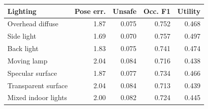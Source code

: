 \begin{tabular}{lrrrr}
\toprule
Lighting & Pose err. & Unsafe & Occ. F1 & Utility \\
\midrule
Overhead diffuse & 1.87 & 0.075 & 0.752 & 0.468 \\
Side light & 1.69 & 0.070 & 0.757 & 0.497 \\
Back light & 1.83 & 0.075 & 0.741 & 0.474 \\
Moving lamp & 2.04 & 0.084 & 0.716 & 0.438 \\
Specular surface & 1.87 & 0.077 & 0.734 & 0.466 \\
Transparent surface & 2.04 & 0.084 & 0.713 & 0.439 \\
Mixed indoor lights & 2.00 & 0.082 & 0.724 & 0.445 \\
\bottomrule
\end{tabular}
